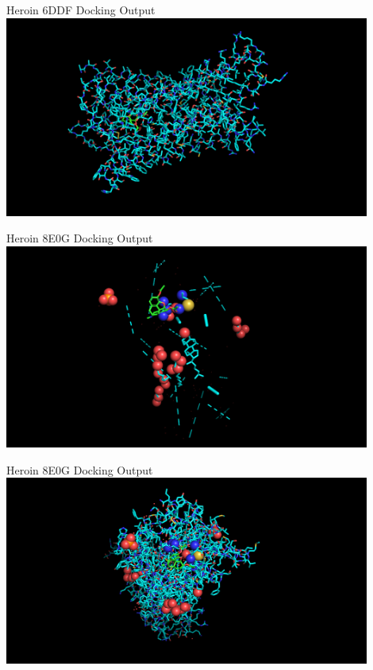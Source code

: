 \documentclass[aspectratio=169]{beamer}
\begin{document}
\begin{frame}{Heroin 6DDF Docking Output}
\includegraphics[width=12cm]{img/Graphs/6ddfSide.png}
\end{frame}
\begin{frame}{Heroin 8E0G Docking Output}
\includegraphics[width=12cm]{img/Graphs/8e0gTransparent.png}
\end{frame}
\begin{frame}{Heroin 8E0G Docking Output}
\includegraphics[width=12cm]{img/Graphs/8e0gFull.png}
\end{frame}
\end{document}
